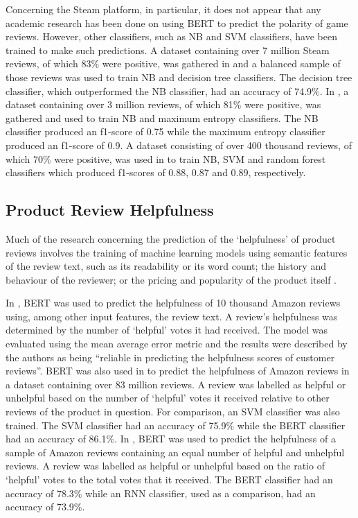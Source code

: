 Concerning the Steam platform, in particular, it does not appear that any academic research has been done on using BERT to predict the polarity of game reviews. However, other classifiers, such as NB and SVM classifiers, have been trained to make such predictions. A dataset containing over 7 million Steam reviews, of which 83\% were positive, was gathered in \cite{zuo2018sentiment} and a balanced sample of those reviews was used to train NB and decision tree classifiers. The decision tree classifier, which outperformed the NB classifier, had an accuracy of 74.9\%. In \cite{sobkowicz2016steam}, a dataset containing over 3 million reviews, of which 81\% were positive, was gathered and used to train NB and maximum entropy classifiers. The NB classifier produced an f1-score of 0.75 while the maximum entropy classifier produced an f1-score of 0.9. A dataset consisting of over 400 thousand reviews, of which 70\% were positive, was used in \cite{miao2021compare} to train NB, SVM and random forest classifiers which produced f1-scores of 0.88, 0.87 and 0.89, respectively.

\subsection{Product Review Helpfulness} \label{sec:LR_NLP_Help}

Much of the research concerning the prediction of the `helpfulness' of product reviews involves the training of machine learning models using semantic features of the review text, such as its readability or its word count; the history and behaviour of the reviewer; or the pricing and popularity of the product itself \cite{yang2015semantic} \cite{lee2014predicting} \cite{zhang2018predicting}.

In \cite{xu2020bert}, BERT was used to predict the helpfulness of 10 thousand Amazon reviews using, among other input features, the review text. A review's helpfulness was determined by the number of `helpful' votes it had received. The model was evaluated using the mean average error metric and the results were described by the authors as being ``reliable in predicting the helpfulness scores of customer reviews''. BERT was also used in \cite{alsmadi2020predicting} to predict the helpfulness of Amazon reviews in a dataset containing over 83 million reviews. A review was labelled as helpful or unhelpful based on the number of `helpful' votes it received relative to other reviews of the product in question. For comparison, an SVM classifier was also trained. The SVM classifier had an accuracy of 75.9\% while the BERT classifier had an accuracy of 86.1\%. In \cite{wang2020study}, BERT was used to predict the helpfulness of a sample of Amazon reviews containing an equal number of helpful and unhelpful reviews. A review was labelled as helpful or unhelpful based on the ratio of `helpful' votes to the total votes that it received. The BERT classifier had an accuracy of 78.3\% while an RNN classifier, used as a comparison, had an accuracy of 73.9\%.

